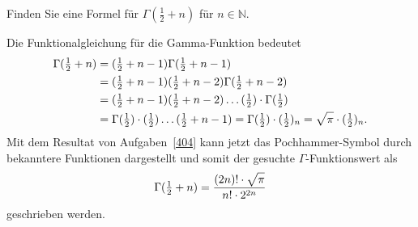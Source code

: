 Finden Sie eine Formel für $\Gamma(\frac12+n)$ für $n\in\mathbb{N}$.

\begin{loesung}
Die Funktionalgleichung für die Gamma-Funktion bedeutet
\begin{align*}
\Gamma({\textstyle\frac12}+n)
&=
({\textstyle\frac12}+n-1)
\Gamma({\textstyle\frac12}+n-1)
\\
&=
({\textstyle\frac12}+n-1)
({\textstyle\frac12}+n-2)
\Gamma({\textstyle\frac12}+n-2)
\\
&=
({\textstyle\frac12}+n-1)
({\textstyle\frac12}+n-2)
\dots
({\textstyle\frac12})
\cdot
\Gamma({\textstyle\frac12})
\\
&=
\Gamma({\textstyle\frac12})
\cdot
({\textstyle\frac12})
\dots
({\textstyle\frac12}+n-1)
=
\Gamma({\textstyle\frac12})\cdot ({\textstyle\frac12})_n
=
\sqrt{\pi\mathstrut}\cdot ({\textstyle\frac12})_n.
\end{align*}
Mit dem Resultat von Aufgaben~\ref{404} kann jetzt das Pochhammer-Symbol
durch bekanntere Funktionen dargestellt und somit der
gesuchte $\Gamma$-Funktionswert als
\[
\Gamma({\textstyle\frac12}+n)
=
\frac{(2n)!\cdot \sqrt{\pi\mathstrut}}{n!\cdot 2^{2n}}
\]
geschrieben werden.
\end{loesung}
